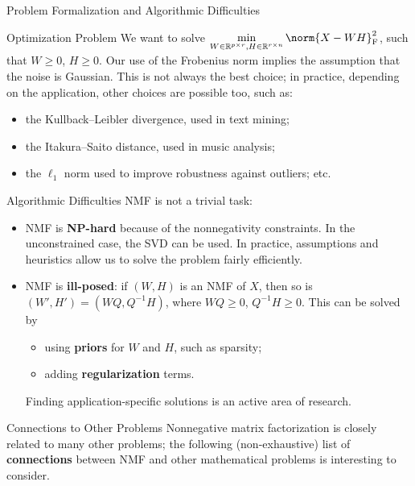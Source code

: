 \documentclass[final]{beamer}
\newlength{\onecolwid}
\newcommand{\real}{\mathbb{R}}
\begin{document}
\begin{frame}
\begin{columns}[t]
\begin{column}{\onecolwid}
\begin{exampleblock}{Problem Formalization and Algorithmic Difficulties}
\vspace{0.4cm}
\begin{block}{Optimization Problem}
We want to solve \(\displaystyle \min_{W \in \real^{p \times r}, H \in \real^{r \times n}} \norm{X - WH}^2_{\textnormal{F}}\), such that \(W \geqslant 0\), \(H \geqslant 0\).
Our use of the Frobenius norm implies the assumption that the noise is Gaussian.
This is not always the best choice; in practice, depending on the application, other choices are possible too, such as:
\begin{itemize}
    \item the Kullback--Leibler divergence, used in text mining;
    \item the Itakura--Saito distance, used in music analysis;
    \item the \(\ell_1\) norm used to improve robustness against outliers; etc.
\end{itemize}
\end{block}
\begin{block}{Algorithmic Difficulties}
NMF is not a trivial task:
\begin{itemize}
    \item NMF is \textbf{NP-hard} because of the nonnegativity constraints.
    In the unconstrained case, the SVD can be used.
    In practice, assumptions and heuristics allow us to solve the problem fairly efficiently.
    \item NMF is \textbf{ill-posed}: if \((W, H)\) is an NMF of \(X\), then so is \((W', H') = (WQ, Q^{-1}H)\), where \(WQ \geqslant 0\), \(Q^{-1}H \geqslant 0\).
    This can be solved by
    \begin{itemize}
        \item using \textbf{priors} for \(W\) and \(H\), such as sparsity;
        \item adding \textbf{regularization} terms.
    \end{itemize}
    Finding application-specific solutions is an active area of research.
\end{itemize}
\end{block}
\end{exampleblock}

\begin{exampleblock}{Connections to Other Problems}
Nonnegative matrix factorization is closely related to many other problems; the following (non-exhaustive) list of \textbf{connections} between NMF and other mathematical problems is interesting to consider.


\end{exampleblock}
\end{column}
\end{columns}
\end{frame}
\end{document}
